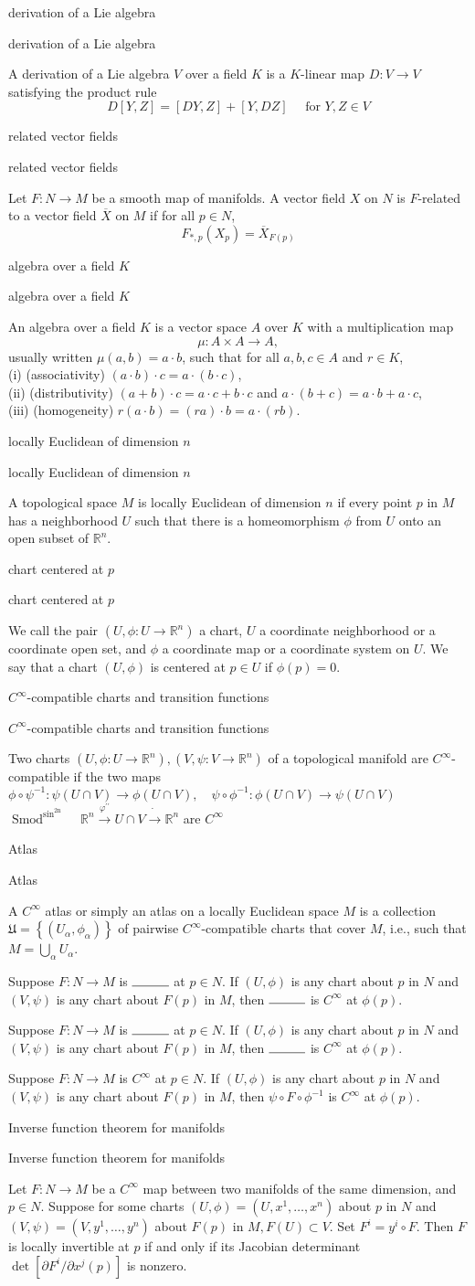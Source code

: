 \documentclass[17pt]{extarticle}
\renewcommand{\bar}[1]{\overline{#1}}
\newcommand{\boxset}[2]{\begin{mdframed}[style=darkQuesion]
#1
\end{mdframed}
\newpage
\begin{mdframed}[style=darkQuesion]
  #1
    \end{mdframed}
\begin{mdframed}[style=darkAnswer]
  #2
    \end{mdframed}
    \newpage
}
\begin{document}
\boxset{derivation of a Lie algebra }
{A derivation of a Lie algebra $V$ over a field $K$ is a $K$-linear map $D: V \rightarrow V$ satisfying the product rule \[D[Y, Z]=[D Y, Z]+[Y, D Z] \quad \text { for } Y, Z \in V\]}
\boxset{related vector fields }
{Let $F: N \rightarrow M$ be a smooth map of manifolds. A vector field $X$ on $N$ is $F$-related to a vector field $\bar{X}$ on $M$ if for all $p \in N$,\[F_{*, p}\left(X_{p}\right)=\bar{X}_{F(p)}\]}
\boxset{algebra over a field $K$ }
{An algebra over a field $K$ is a vector space $A$ over $K$ with a multiplication map \[\mu: A \times A \rightarrow A,\] usually written $\mu(a, b)=a \cdot b$, such that for all $a, b, c \in A$ and $r \in K$,\[\ \] (i) (associativity) $(a \cdot b) \cdot c=a \cdot(b \cdot c)$,\[\ \] (ii) (distributivity) $(a+b) \cdot c=a \cdot c+b \cdot c$ and $a \cdot(b+c)=a \cdot b+a \cdot c$,\[\ \] (iii) (homogeneity) $r(a \cdot b)=(r a) \cdot b=a \cdot(r b)$.}
\boxset{locally Euclidean of dimension $n$ }
{A topological space $M$ is locally Euclidean of dimension $n$ if every point $p$ in $M$ has a neighborhood $U$ such that there is a homeomorphism $\phi$ from $U$ onto an open subset of $\mathbb{R}^{n}$.}
\boxset{chart centered at $p$ }
{We call the pair $\left(U, \phi: U \rightarrow \mathbb{R}^{n}\right)$ a chart, $U$ a coordinate neighborhood or a coordinate open set, and $\phi$ a coordinate map or a coordinate system on $U$. We say that a chart $(U, \phi)$ is centered at $p \in U$ if $\phi(p)=0$.}
\boxset{$C^{\infty}$-compatible charts and transition functions }
{Two charts $\left(U, \phi: U \rightarrow \mathbb{R}^{n}\right),\left(V, \psi: V \rightarrow \mathbb{R}^{n}\right)$ of a topological manifold are $C^{\infty}$-compatible if the two maps $\phi \circ \psi^{-1}: \psi(U \cap V) \rightarrow \phi(U \cap V), \quad \psi \circ \phi^{-1}: \phi(U \cap V) \rightarrow \psi(U \cap V)$ $\operatorname{Smod}^{\sin ^{\text {2n }}} \quad \mathbb{R}^{n} \stackrel{\varphi^{\prime \prime}}{\rightarrow} U \cap V \dot{\longrightarrow} \mathbb{R}^{n}$ are $C^{\infty}$ }
\boxset{Atlas }
{A $C^{\infty}$ atlas or simply an atlas on a locally Euclidean space $M$ is a collection $\mathfrak{U}=\left\{\left(U_{\alpha}, \phi_{\alpha}\right)\right\}$ of pairwise $C^{\infty}$-compatible charts that cover $M$, i.e., such that $M=\bigcup_{\alpha} U_{\alpha}$.}
\boxset{Suppose $F: N \rightarrow M$ is $\rule{1cm}{0.15mm}$ at $p \in N$. If $(U, \phi)$ is any chart about $p$ in $N$ and $(V, \psi)$ is any chart about $F(p)$ in $M$, then $\rule{1cm}{0.15mm}$ is $C^{\infty}$ at $\phi(p)$. }
{Suppose $F: N \rightarrow M$ is $C^{\infty}$ at $p \in N$. If $(U, \phi)$ is any chart about $p$ in $N$ and $(V, \psi)$ is any chart about $F(p)$ in $M$, then $\psi \circ F \circ \phi^{-1}$ is $C^{\infty}$ at $\phi(p)$.}
\boxset{Inverse function theorem for manifolds }
{Let $F: N \rightarrow M$ be a $C^{\infty}$ map between two manifolds of the same dimension, and $p \in N$. Suppose for some charts $(U, \phi)=\left(U, x^{1}, \ldots, x^{n}\right)$ about $p$ in $N$ and $(V, \psi)=\left(V, y^{1}, \ldots, y^{n}\right)$ about $F(p)$ in $M, F(U) \subset V$. Set $F^{i}=y^{i} \circ F$. Then $F$ is locally invertible at $p$ if and only if its Jacobian determinant $\operatorname{det}\left[\partial F^{i} / \partial x^{j}(p)\right]$ is nonzero.}
\end{document}
